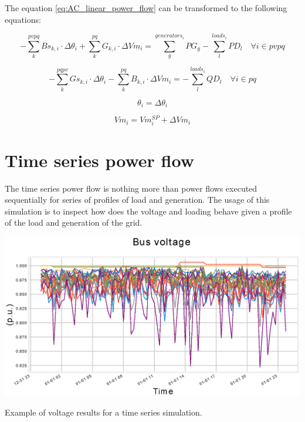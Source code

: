 \documentclass[nols,a4paper,twoside,symmetric,notoc,fleqn]{tufte-book}
\begin{document}
The equation \ref{eq:AC_linear_power_flow} can be transformed to the following equations:

\begin{equation}
-\sum_{k}^{pvpq}Bs_{k,i} \cdot \Delta\theta_i + \sum_{k}^{pq}G_{k,i} \cdot \Delta Vm_i = \sum_{g}^{generators_i} PG_{g} - \sum_{l}^{loads_i} PD_l \quad \forall i \in pvpq
\end{equation}

\begin{equation}
-\sum_{k}^{pqpv}Gs_{k,i} \cdot \Delta\theta_i - \sum_{k}^{pq}B_{k,i} \cdot \Delta Vm_i = - \sum_{l}^{loads_i} QD_l \quad \forall i \in pq
\end{equation}

\begin{equation}
\theta_i = \Delta \theta_i
\end{equation}

\begin{equation}
Vm_i = Vm_i^{SP} + \Delta Vm_i
\end{equation}

\chapter{Time series power flow}

The time series power flow is nothing more than power flows executed sequentially for series of profiles of load and generation. The usage of this simulation is to inspect how does the voltage and loading behave given a profile of the load and generation of the grid.

\begin{marginfigure}
	\includegraphics[width=\linewidth]{img/Time_series.eps}
	\caption{Example of voltage results for a time series simulation.}
	\label{fig:time_series}
\end{marginfigure}
\end{document}
